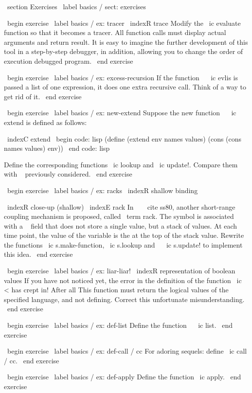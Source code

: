 {{\ section {Exercises} \ label {basics / sect: exercises}

\ begin {exercise} \ label {basics / ex: tracer}
\ indexR {trace}
Modify the \ ic {evaluate} function so that it becomes a tracer. All
function calls must display actual arguments and return
result. It is easy to imagine the further development of this tool
in a step-by-step debugger, in addition, allowing you to change the order of execution
debugged program.
\ end {exercise}

\ begin {exercise} \ label {basics / ex: excess-recursion}
If the function ~ \ ic {evlis} is passed a list of one expression, it does
one extra recursive call. Think of a way to get rid of it.
\ end {exercise}

\ begin {exercise} \ label {basics / ex: new-extend}
Suppose the new function ~ \ ic {extend} is defined as follows:

\ indexC {extend}
\ begin {code: lisp}
(define (extend env names values)
  (cons (cons names values) env))
\ end {code: lisp}

Define the corresponding functions \ ic {lookup} and \ ic {update!}. Compare them
with ~ previously considered.
\ end {exercise}

\ begin {exercise} \ label {basics / ex: racks}
\ indexR {shallow} binding}
\ indexR {close-up (shallow)}
\ indexE {rack}
In ~ ~ cite {ss80}, another short-range coupling mechanism is proposed, called
\ term {rack}. The symbol is associated with a ~ field that does not store a single value, but
a stack of values. At each time point, the value of the variable is the
at the top of the stack value. Rewrite the functions \ ic {s.make-function},
\ ic {s.lookup} and ~ \ ic {s.update!} to implement this idea.
\ end {exercise}

\ begin {exercise} \ label {basics / ex: liar-liar!}
\ indexR {representation of boolean values}
If you have not noticed yet, the error in the definition of the function \ ic {<} has crept in! After all
This function must return the logical values ​​of the specified language, and
not defining. Correct this unfortunate misunderstanding.
\ end {exercise}

\ begin {exercise} \ label {basics / ex: def-list}
Define the function ~ \ ic {list}.
\ end {exercise}

\ begin {exercise} \ label {basics / ex: def-call / cc}
For adoring sequels: define \ ic {call / cc}.
\ end {exercise}

\ begin {exercise} \ label {basics / ex: def-apply}
Define the function \ ic {apply}.
\ end {exercise}

}
